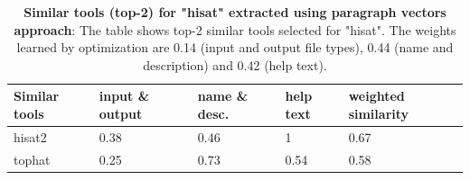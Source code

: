 \begin{table}[ht]
\begin{center}
    \begin{tabular}{|l|l|l|l|l|}
        \hline
        Similar tools   & input \& output & name \& desc. & help text & weighted similarity \\ \hline
        hisat2   & 0.38 & 0.46 & 1 & 0.67 \\ \hline
        tophat & 0.25 & 0.73 & 0.54 & 0.58 \\ \hline
    \end{tabular}
    \end{center}
    \caption[Similar tools (top-2) for "hisat" extracted using paragraph vectors approach]{\textbf{Similar tools (top-2) for "hisat" extracted using paragraph vectors approach}: The table shows top-2 similar tools selected for "hisat". The weights learned by optimization are 0.14 (input and output file types), 0.44 (name and description) and 0.42 (help text).}
    \label{tab:accuracy}
\end{table}